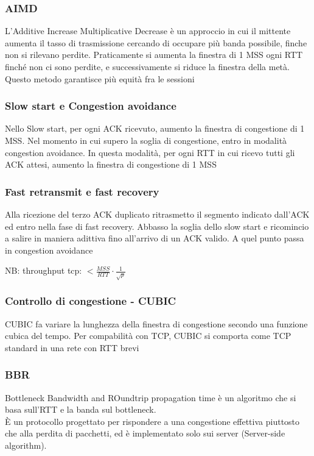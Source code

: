 \documentclass[12pt, a4paper]{article}
\begin{document}
\subsubsection{AIMD}
L'Additive Increase Multiplicative Decrease è un approccio in cui il mittente aumenta il tasso di trasmissione 
cercando di occupare più banda possibile, finche non si rilevano perdite. Praticamente si aumenta la finestra di 
1 MSS ogni RTT finché non ci sono perdite, e successivamente si riduce la finestra della metà. Questo metodo 
garantisce più equità fra le sessioni

\subsubsection{Slow start e Congestion avoidance}
Nello Slow start, per ogni ACK ricevuto, aumento la finestra di congestione di 1 MSS. Nel momento in cui supero 
la soglia di congestione, entro in modalità congestion avoidance. In questa modalità, per ogni RTT in cui 
ricevo tutti gli ACK attesi, aumento la finestra di congestione di 1 MSS

\subsubsection{Fast retransmit e fast recovery}
Alla ricezione del terzo ACK duplicato ritrasmetto il segmento indicato dall'ACK ed entro nella fase di fast 
recovery. Abbasso la soglia dello slow start e ricomincio a salire in maniera adittiva fino all'arrivo di un ACK
valido. A quel punto passa in congestion avoidance

NB: throughput tcp: $<\frac{MSS}{RTT}\cdot\frac{1}{\sqrt{p}}$

\subsubsection{Controllo di congestione - CUBIC}
CUBIC fa variare la lunghezza della finestra di congestione secondo una funzione cubica del tempo. Per 
compabilità con TCP, CUBIC  si comporta come TCP standard in una rete con RTT brevi 

\subsubsection{BBR}
Bottleneck Bandwidth and ROundtrip propagation time è un algoritmo che si basa sull'RTT e la banda sul 
bottleneck.\\È un protocollo progettato per rispondere a una congestione effettiva piuttosto che alla 
perdita di pacchetti, ed è implementato solo sui server (Server-side algorithm).
\end{document}
